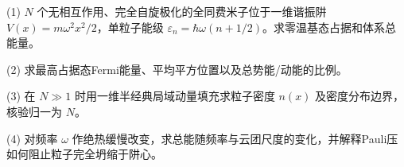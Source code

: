 (1) \(N\) 个无相互作用、完全自旋极化的全同费米子位于一维谐振阱 \(V(x)=m\omega^2x^2/2\)，单粒子能级 \(\varepsilon_n=\hbar\omega(n+1/2)\)。求零温基态占据和体系总能量。

(2) 求最高占据态Fermi能量、平均平方位置以及总势能/动能的比例。

(3) 在 \(N\gg1\) 时用一维半经典局域动量填充求粒子密度 \(n(x)\) 及密度分布边界，核验归一为 \(N\)。

(4) 对频率 \(\omega\) 作绝热缓慢改变，求总能随频率与云团尺度的变化，并解释Pauli压如何阻止粒子完全坍缩于阱心。
